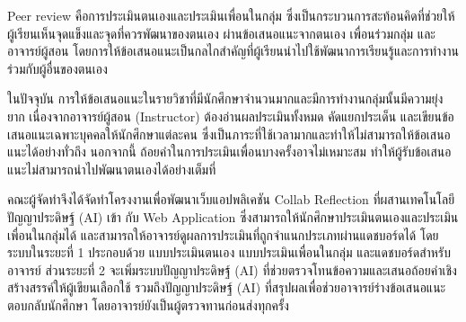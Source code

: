 \maketitle
\makesignature

\begin{abstractTH}
Peer review คือการประเมินตนเองและประเมินเพื่อนในกลุ่ม ซึ่งเป็นกระบวนการสะท้อนคิดที่ช่วยให้ผู้เรียนเห็นจุดแข็งและจุดที่ควรพัฒนาของตนเอง ผ่านข้อเสนอแนะจากตนเอง เพื่อนร่วมกลุ่ม และอาจารย์ผู้สอน โดยการให้ข้อเสนอแนะเป็นกลไกสำคัญที่ผู้เรียนนำไปใช้พัฒนาการเรียนรู้และการทำงานร่วมกับผู้อื่นของตนเอง

ในปัจจุบัน การให้ข้อเสนอแนะในรายวิชาที่มีนักศึกษาจำนวนมากและมีการทำงานกลุ่มนั้นมีความยุ่งยาก เนื่องจากอาจารย์ผู้สอน (Instructor) ต้องอ่านผลประเมินทั้งหมด คัดแยกประเด็น และเขียนข้อเสนอแนะเฉพาะบุคคลให้นักศึกษาแต่ละคน ซึ่งเป็นภาระที่ใช้เวลามากและทำให้ไม่สามารถให้ข้อเสนอแนะได้อย่างทั่วถึง นอกจากนี้ ถ้อยคำในการประเมินเพื่อนบางครั้งอาจไม่เหมาะสม ทำให้ผู้รับข้อเสนอแนะไม่สามารถนำไปพัฒนาตนเองได้อย่างเต็มที่

คณะผู้จัดทำจึงได้จัดทำโครงงานเพื่อพัฒนาเว็บแอปพลิเคชัน Collab Reflection ที่ผสานเทคโนโลยีปัญญาประดิษฐ์ (AI) เข้า กับ Web Application ซึ่งสามารถให้นักศึกษาประเมินตนเองและประเมินเพื่อนในกลุ่มได้ และสามารถให้อาจารย์ดูผลการประเมินที่ถูกจำแนกประเภทผ่านแดชบอร์ดได้ โดยระบบในระยะที่ 1 ประกอบด้วย แบบประเมินตนเอง แบบประเมินเพื่อนในกลุ่ม และแดชบอร์ดสำหรับอาจารย์ ส่วนระยะที่ 2 จะเพิ่มระบบปัญญาประดิษฐ์ (AI) ที่ช่วยตรวจโทนข้อความและเสนอถ้อยคำเชิงสร้างสรรค์ให้ผู้เขียนเลือกใช้ รวมถึงปัญญาประดิษฐ์ (AI) ที่สรุปผลเพื่อช่วยอาจารย์ร่างข้อเสนอแนะตอบกลับนักศึกษา โดยอาจารย์ยังเป็นผู้ตรวจทานก่อนส่งทุกครั้ง
\end{abstractTH}

